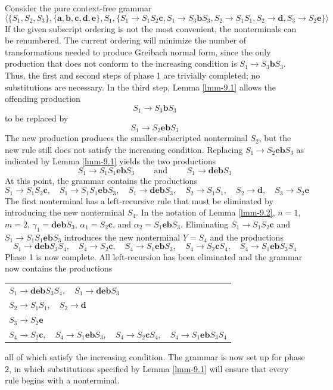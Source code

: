 Consider the pure context-free grammar
\[ \langle\{S_1,S_2,S_3\},\{\pmb{a},\pmb{b},\pmb{c},\pmb{d},\pmb{e}\},S_1,
	\{S_1\rightarrow S_1S_2\pmb{c},S_1\rightarrow S_3\pmb{b}S_3,S_2
	\rightarrow S_1S_1,S_2\rightarrow\pmb{d},S_3\rightarrow S_2\pmb{e}\}
	\rangle \]
If the given subscript ordering is not the most convenient, the nonterminals
can be renumbered. The current ordering will minimize the number of
transformations needed to produce Greibach normal form, since the only
production that does not conform to the increasing condition is $S_1\rightarrow
S_3\pmb{b}S_3$. Thus, the first and second steps of phase 1 are trivially
completed; no substitutions are necessary. In the third step, Lemma \ref{lmm-9.1} allows
the offending production
\[ S_1 \rightarrow S_3\pmb{b}S_3 \]
to be replaced by
\[ S_1 \rightarrow S_2\pmb{eb}S_3 \]
The new production produces the smaller-subscripted nonterminal $S_2$, but the
new rule still does not satisfy the increasing condition. Replacing $S_1
\rightarrow S_2\pmb{eb}S_3$ as indicated by Lemma \ref{lmm-9.1} yields the two productions
\[ S_1 \rightarrow S_1S_1\pmb{eb}S_3\qquad\text{ and }\qquad S_1 \rightarrow
	\pmb{deb}S_3 \]
At this point, the grammar contains the productions
\[ S_1 \rightarrow S_1S_2\pmb{c},\quad S_1\rightarrow S_1S_1\pmb{eb}S_3,\quad
	S_1\rightarrow\pmb{deb}S_3,\quad S_2\rightarrow S_1S_1,\quad S_2
	\rightarrow\pmb{d},\quad S_3\rightarrow S_2\pmb{e} \]
The first nonterminal has a left-recursive rule that must be eliminated by
introducing the new nonterminal $S_4$. In the notation of Lemma \ref{lmm-9.2}, $n=1$,
$m=2$, $\gamma_1=\pmb{deb}S_3$, $\alpha_1 = S_2\pmb{c}$, and $\alpha_2 = S_1
\pmb{eb}S_3$. Eliminating $S_1\rightarrow S_1S_2\pmb{c}$ and $S_1\rightarrow
S_1S_1\pmb{eb}S_3$ introduces the new nonterminal $Y = S_4$ and the productions
\[ S_1\rightarrow\pmb{deb}S_3S_4,\quad S_4\rightarrow S_2\pmb{c},\quad S_4
	\rightarrow S_1\pmb{eb}S_3,\quad S_4\rightarrow S_2\pmb{c}S_4,\quad S_4
	\rightarrow S_1\pmb{eb}S_3S_4 \]
Phase 1 is now complete. All left-recursion has been eliminated and the grammar
now contains the productions
\begin{center}\begin{tabular}{l}
$S_1 \rightarrow \pmb{deb}S_3S_4,\quad S_1 \rightarrow \pmb{deb}S_3$ \\
$S_2 \rightarrow S_1S_1,\quad S_2 \rightarrow \pmb{d}$ \\
$S_3 \rightarrow S_2\pmb{e}$ \\
$S_4 \rightarrow S_2\pmb{c},\quad S_4 \rightarrow S_1\pmb{eb}S_3,\quad S_4 
	\rightarrow S_2\pmb{c}S_4,\quad S_4 \rightarrow S_1\pmb{eb}S_3S_4$
\end{tabular}\end{center}
all of which satisfy the increasing condition. The grammar is now set up for
phase 2, in which substitutions specified by Lemma \ref{lmm-9.1} will ensure that every
rule begins with a nonterminal.

